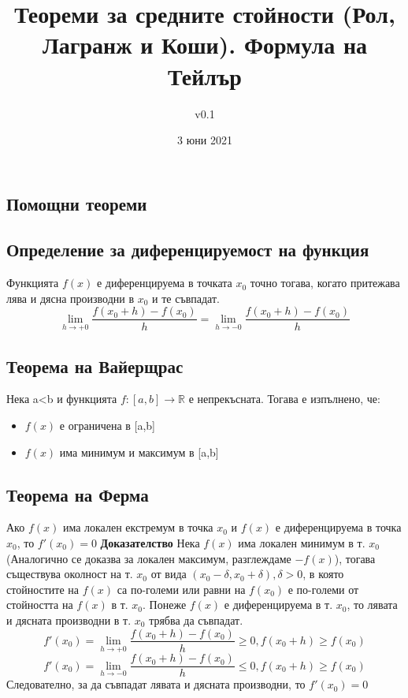 \documentclass[fleqn,12pt]{article}
\title{Теореми  за  средните  стойности  (Рол,  Лагранж  и  Коши).  Формула  на Тейлър}
\author{v0.1}
\date{3 юни 2021}
\begin{document}
    
\maketitle

\tableofcontents

\begin{flushleft}
    
\section{Помощни теореми}

\subsection{Определение за диференцируемост на функция}
Функцията $f(x)$ е диференцируема в точката $x_0$ точно тогава, когато притежава лява и дясна производни в $x_0$ и те съвпадат.
\[\lim_{h \to +0} \frac{f(x_0 + h)-f(x_0)}{h} = \lim_{h \to -0} \frac{ f(x_0 + h)-f(x_0)}{h}\]

\subsection{Теорема на Вайерщрас}
Нека a<b и функцията $f:[a,b]\rightarrow\mathbb{R}$ е непрекъсната. Тогава е изпълнено, че:
\begin{itemize}
    \item $f(x)$ е ограничена в [a,b]
    \item $f(x)$ има минимум и максимум в [a,b] 
\end{itemize}

\subsection{Теорема на Ферма}
Ако $f(x)$ има локален екстремум в точка $x_0$ и $f(x)$ е диференцируема в точка $x_0$, то $f'(x_0)=0$
\bigbreak
\textbf{Доказателство}
Нека $f(x)$ има локален минимум в т. $x_0$ (Аналогично се доказва за локален максимум, разглеждаме $-f(x)$),
тогава съществува околност на т. $x_0$ от вида $(x_0 - \delta,x_0 + \delta), \delta > 0$, в която стойностите на $f(x)$ са по-големи или равни на $f(x_0)$
е по-големи от стойността на $f(x)$ в т. $x_0$. Понеже $f(x)$ е диференцируема в т. $x_0$, то лявата и дясната производни в т. $x_0$ трябва да съвпадат.
\[f'(x_0) = \lim_{h \to +0} \frac{ f(x_0 + h)-f(x_0)}{h} \geq 0, f(x_0 + h) \geq f(x_0)\]
\[f'(x_0) = \lim_{h \to -0} \frac{ f(x_0 + h)-f(x_0)}{h} \leq 0, f(x_0 + h) \geq f(x_0)\]
Следователно, за да съвпадат лявата и дясната производни, то $f'(x_0) = 0$


\end{flushleft}
\end{document}

